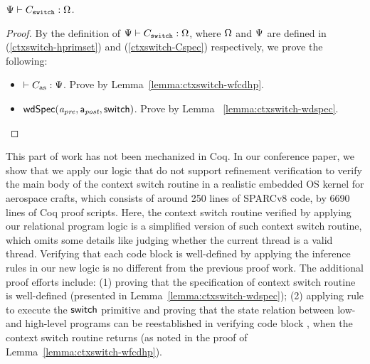 \begin{theorem}
    \em
    ${\Psi} \vdash {C_{\texttt{switch}}} : {\Omega}$.
\end{theorem}
\begin{proof}
    By the definition of
    ${\Psi} \vdash {C_{\texttt{switch}}} : {\Omega}$,
    where $\Omega$ and $\Psi{}$ are defined in
    (\ref{ctxswitch-hprimset}) and (\ref{ctxswitch-Cspec})
    respectively, we prove the following:
    \begin{itemize}
        \item $\vdash {C_{\text{as}}} : {\Psi{}}$.
            Prove by Lemma~\ref{lemma:ctxswitch-wfcdhp}.
        \item $\textsf{wdSpec}({\textit{a}_\textit{pre}}, {\mathsf{a}_{\textit{post}}}, {\mathsf{switch}})$.
            Prove by Lemma ~\ref{lemma:ctxswitch-wdspec}.
    \end{itemize}
\end{proof}

This part of work has not been mechanized in Coq.
In our conference paper, we show that
we apply our logic that do not support
refinement verification to verify
the main body of the context switch routine in
a realistic embedded OS kernel for aerospace crafts,
which consists of around 250 lines of SPARCv8 code,
by 6690 lines of Coq proof scripts. Here, the
context switch routine verified by applying our
relational program logic is a
simplified version of such context switch routine,
which omits some details like judging whether the
current thread is a valid thread.
Verifying that each code block is well-defined
by applying the inference rules in our new logic is
no different from the previous proof work.
The additional proof efforts include:
(1) proving that the specification of context
switch routine is well-defined (presented in
Lemma~\ref{lemma:ctxswitch-wdspec});
(2) applying  rule to execute
the $\mathsf{switch}$ primitive and proving that the state
relation between low- and high-level programs
can be reestablished in verifying code block
\SwitchNewTask{}, when the context switch routine
returns (as noted in the proof of
Lemma~\ref{lemma:ctxswitch-wfcdhp}).

